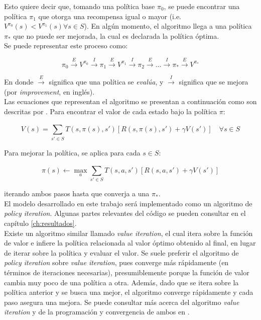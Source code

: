 Esto quiere decir que, tomando una pol\'itica base $\pi_0$, se puede encontrar una pol\'itica $\pi_1$ que otorga una recompensa igual o mayor (i.e. $V^{\pi_0}(s)<V^{\pi_1}(s) \forall s \in S$). En alg\'un momento, el algoritmo llega a una pol\'itica $\pi_{*}$ que no puede ser mejorada, la cual es declarada la pol\'itica \'optima.\\


Se puede representar este proceso como:

$$
\pi_0 \overset{E}{\rightarrow} V^{\pi_{0}} \overset{I}{\rightarrow}
\pi_1 \overset{E}{\rightarrow} V^{\pi_{1}} \overset{I}{\rightarrow}
\pi_2 \overset{E}{\rightarrow} 
...
\overset{I}{\rightarrow} \pi_{*} \overset{E}{\rightarrow} V^{\pi_{*}}
$$

En donde $\overset{E}{\rightarrow}$ significa que una pol\'itica se \textit{eval\'ua}, y $\overset{I}{\rightarrow}$ significa que se mejora (por \textit{improvement}, en ingl\'es). \\

Las ecuaciones que representan el algoritmo se presentan a continuaci\'on como son descritas por \citet{Frazzoli}. Para encontrar el valor de cada estado bajo la pol\'itica $\pi$:

$$
V(s) = \sum_{s' \in S}^{ } T(s, \pi(s), s')[R(s, \pi(s), s') + \gamma V(s')] \quad \forall s \in S
$$

Para mejorar la pol\'itica, se aplica para cada $s \in S$:

$$
\pi(s) \leftarrow \max_a \sum_{s' \in S}^{ }T(s,a,s')[R(s,a,s') + \gamma V(s')]
$$

iterando ambos pasos hasta que converja a una $\pi_*$.\\

El modelo desarrollado en este trabajo ser\'a implementado como un algoritmo de \textit{policy iteration}. Algunas partes relevantes del c\'odigo se pueden consultar en el cap\'itulo  \ref{ch:resultados}.\\

Existe un algoritmo similar llamado \textit{value iteration}, el cual itera sobre la funci\'on de valor e infiere la pol\'itica relacionada al valor \'optimo obtenido al final, en lugar de iterar sobre la pol\'itica y evaluar el valor. Se suele preferir el algoritmo de \textit{policy iteration} sobre \textit{value iteration}, pues converge m\'as r\'apidamente (en t\'erminos de iteraciones necesarias), presumiblemente porque la funci\'on de valor cambia muy poco de una pol\'itica a otra. Adem\'as, dado que se itera sobre la pol\'itica anterior y se busca una mejor, el algoritmo converge r\'apidamente y cada paso asegura una mejora. Se puede consultar m\'as acerca del algoritmo \textit{value iteration} y de la programaci\'on y convergencia de ambos en \citet{Sutton}.

